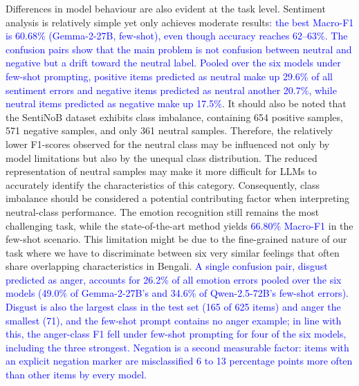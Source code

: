 \documentclass[10pt,letterpaper]{article}
\newcommand{\rev}[1]{\textcolor{blue}{#1}}
\begin{document}
Differences in model behaviour are also evident at the task level. Sentiment analysis is relatively simple yet only achieves moderate results\rev{: the best Macro-F1 is 60.68\% (Gemma-2-27B, few-shot), even though accuracy reaches 62--63\%. The confusion pairs show that the main problem is not confusion between neutral and negative but a drift toward the neutral label. Pooled over the six models under few-shot prompting, positive items predicted as neutral make up 29.6\% of all sentiment errors and negative items predicted as neutral another 20.7\%, while neutral items predicted as negative make up 17.5\%}. It should also be noted that the SentiNoB dataset exhibits class imbalance, containing 654 positive samples, 571 negative samples, and only 361 neutral samples. Therefore, the relatively lower F1-scores observed for the neutral class may be influenced not only by model limitations but also by the unequal class distribution. The reduced representation of neutral samples may make it more difficult for LLMs to accurately identify the characteristics of this category. Consequently, class imbalance should be considered a potential contributing factor when interpreting neutral-class performance. The emotion recognition still remains the most challenging task, while the state-of-the-art method yields \rev{66.80\% Macro-F1} in the few-shot scenario. This limitation might be due to the fine-grained nature of our task where we have to discriminate between six very similar feelings that often share overlapping characteristics in Bengali. \rev{A single confusion pair, disgust predicted as anger, accounts for 26.2\% of all emotion errors pooled over the six models (49.0\% of Gemma-2-27B's and 34.6\% of Qwen-2.5-72B's few-shot errors). Disgust is also the largest class in the test set (165 of 625 items) and anger the smallest (71), and the few-shot prompt contains no anger example; in line with this, the anger-class F1 fell under few-shot prompting for four of the six models, including the three strongest. Negation is a second measurable factor: items with an explicit negation marker are misclassified 6 to 13 percentage points more often than other items by every model.}
\end{document}
